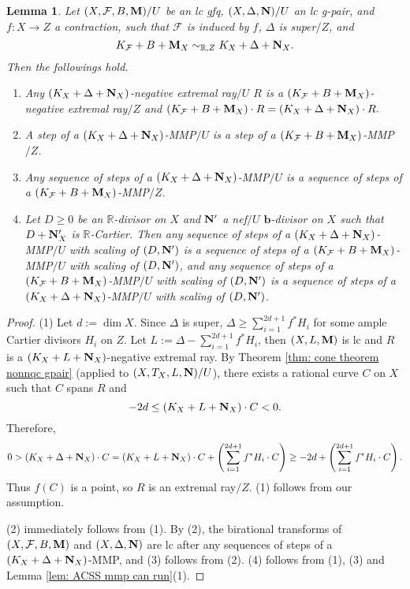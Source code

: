 \documentclass[11pt]{amsart}
\numberwithin{equation}{section}
\newcommand{\bb}{\bm{b}}
\newcommand{\Mm}{{\bf{M}}}
\newcommand{\Nn}{{\bf{N}}}
\newcommand{\Rr}{\mathbb{R}}
\newcommand{\Ff}{\mathcal{F}}
\newtheorem{lem}[thm]{Lemma}
\theoremstyle{definition}
\theoremstyle{definition}
\theoremstyle{definition}
\begin{document}
\begin{lem}\label{lem: super mmp with scaling}
Let $(X,\Ff,B,\Mm)/U$ be an lc gfq, $(X,\Delta,\Nn)/U$ an lc g-pair, and $f: X\rightarrow Z$ a contraction, such that $\Ff$ is induced by $f$, $\Delta$ is super$/Z$, and
$$K_{\Ff}+B+\Mm_X\sim_{\mathbb R,Z}K_X+\Delta+\Nn_X.$$
Then the followings hold.
\begin{enumerate}
  \item Any $(K_X+\Delta+\Nn_X)$-negative extremal ray$/U$ $R$ is a $(K_{\Ff}+B+\Mm_X)$-negative extremal ray$/Z$ and $(K_{\Ff}+B+\Mm_X)\cdot R=(K_X+\Delta+\Nn_X)\cdot R.$
  \item A step of a $(K_X+\Delta+\Nn_X)$-MMP$/U$ is a step of a $(K_{\Ff}+B+\Mm_X)$-MMP$/Z$.
  \item Any sequence of steps of a $(K_X+\Delta+\Nn_X)$-MMP$/U$ is a sequence of steps of a $(K_{\Ff}+B+\Mm_X)$-MMP$/Z$.
  \item Let $D\geq 0$ be an $\Rr$-divisor on $X$ and $\Nn'$ a nef$/U$ $\bb$-divisor on $X$ such that $D+\Nn'_X$ is $\Rr$-Cartier. Then any sequence of steps of a $(K_X+\Delta+\Nn_X)$-MMP$/U$ with scaling of $(D,\Nn')$ is a sequence of steps of a $(K_{\Ff}+B+\Mm_X)$-MMP$/U$ with scaling of $(D,\Nn')$, and any sequence of steps of a $(K_{\Ff}+B+\Mm_X)$-MMP$/U$ with scaling of $(D,\Nn')$ is a sequence of steps of a $(K_X+\Delta+\Nn_X)$-MMP$/U$ with scaling of $(D,\Nn')$.
\end{enumerate}
\end{lem}
\begin{proof}
(1) Let $d:=\dim X$. Since $\Delta$ is super, $\Delta\geq\sum_{i=1}^{2d+1}f^*H_i$ for some ample Cartier divisors $H_i$ on $Z$. Let $L:=\Delta-\sum_{i=1}^{2d+1}f^*H_i$, then $(X,L,\Mm)$ is lc and $R$ is a $(K_X+L+\Nn_X)$-negative extremal ray. By Theorem \ref{thm: cone theorem nonnqc gpair} (applied to $(X,T_X,L,\Nn)/U$), there exists a rational curve $C$ on $X$ such that $C$ spans $R$ and $$-2d\leq (K_X+L+\Nn_X)\cdot C<0.$$ Therefore,
$$0>(K_X+\Delta+\Nn_X)\cdot C=(K_X+L+\Nn_X)\cdot C+\left(\sum_{i=1}^{2d+1}f^*H_i\cdot C\right)\geq -2d+\left(\sum_{i=1}^{2d+1}f^*H_i\cdot C\right).$$
Thus $f(C)$ is a point, so $R$ is an extremal ray$/Z$. (1) follows from our assumption.

(2) immediately follows from (1). By (2), the birational transforms of $(X,\Ff,B,\Mm)$ and $(X,\Delta,\Nn)$ are lc after any sequences of steps of a $(K_X+\Delta+\Nn_X)$-MMP, and (3) follows from (2). (4) follows from (1), (3) and Lemma \ref{lem: ACSS mmp can run}(1).
\end{proof}
\end{document}
